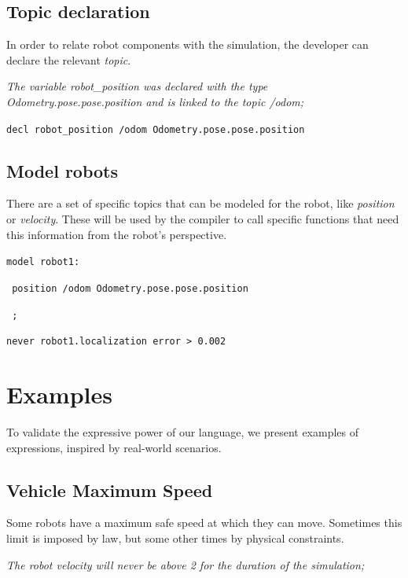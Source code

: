 \documentclass[runningheads]{llncs}
\begin{document}
\subsection{Topic declaration}

In order to relate robot components with the simulation, the developer can declare the relevant \textit{topic}.

\textit{The variable robot\_position was declared with the type Odometry.pose.pose.position and is linked to the topic /odom;}

\vspace{3mm}

\texttt{decl robot\_position /odom Odometry.pose.pose.position}


\subsection{Model robots}

There are a set of specific topics that can be modeled for the robot, like \textit{position} or \textit{velocity}. These will be used by the compiler to call specific functions that need this information from the robot's perspective.

\vspace{3mm}

\texttt{model robot1:}

\texttt{    position /odom Odometry.pose.pose.position}

\texttt{    ;}

\vspace{3mm}

\texttt{never robot1.localization error > 0.002}


\section{Examples}

To validate the expressive power of our language, we present examples of expressions, inspired by real-world scenarios.


\subsection{Vehicle Maximum Speed}

Some robots have a maximum safe speed at which they can move. Sometimes this limit is imposed by law, but some other times by physical constraints.


\textit{The robot velocity will never be above 2 for the duration of the simulation;}
\end{document}
